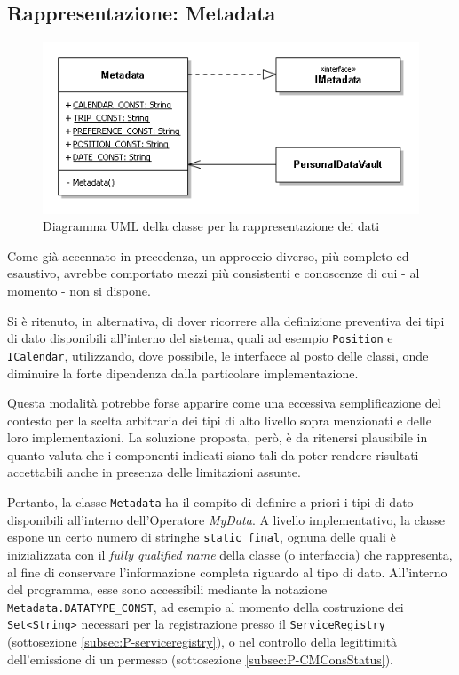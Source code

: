 \subsection{Rappresentazione: Metadata}
\label{subsec:P-metadata}
\begin{figure} [h]
	\centering
	\includegraphics[width=0.7\linewidth]{pictures/Metadata.png}
	\caption{Diagramma UML della classe per la rappresentazione dei dati}
	\label{fig:Metadata}
\end{figure}
Come gi\`a accennato in precedenza, un approccio diverso, pi\`u completo ed esaustivo, avrebbe comportato mezzi pi\`u consistenti e conoscenze di cui - al momento - non si dispone.

Si \`e ritenuto, in alternativa, di dover ricorrere alla definizione preventiva dei tipi di dato disponibili all’interno del sistema, quali ad esempio \texttt{Position} e \texttt{ICalendar}, utilizzando, dove possibile, le interfacce al posto delle classi, onde diminuire la forte dipendenza dalla particolare implementazione.

Questa modalit\`a potrebbe forse apparire come una eccessiva semplificazione del contesto per la scelta arbitraria dei tipi di alto livello sopra menzionati e delle loro implementazioni. La soluzione proposta, per\`o, \`e da ritenersi plausibile in quanto valuta che i componenti indicati siano tali da poter rendere risultati accettabili anche in presenza delle limitazioni assunte.

Pertanto, la classe \texttt{Metadata} ha il compito di definire a priori i tipi di dato disponibili all’interno dell’Operatore \textit{MyData}. A livello implementativo, la classe espone un certo numero di stringhe \texttt{static final}, ognuna delle quali \`e inizializzata con il \textit{fully qualified name} della classe (o interfaccia) che rappresenta, al fine di conservare l’informazione completa riguardo al tipo di dato. All’interno del programma, esse sono accessibili mediante la notazione \texttt{Metadata.DATATYPE\_CONST}, ad esempio al momento della costruzione dei \texttt{Set<String>} necessari per la registrazione presso il \texttt{ServiceRegistry} (sottosezione \ref{subsec:P-serviceregistry}), o nel controllo della legittimit\`a dell’emissione di un permesso (sottosezione \ref{subsec:P-CMConsStatus}).


